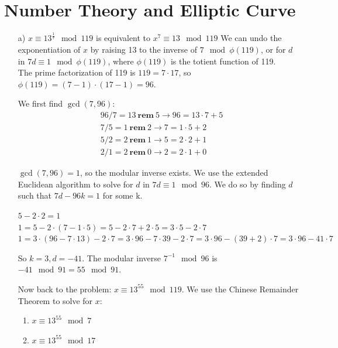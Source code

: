 \documentclass[10pt, oneside]{article}
\begin{document}
\section{Number Theory and Elliptic Curve}
\begin{itemize}
    \item[a)] $x \equiv 13^{\frac{1}{7}} \mod 119$ is equivalent to $x^7 \equiv 13 \mod 119$ 
            We can undo the exponentiation of $x$ by raising 13 to the inverse of $7 \mod \phi(119)$, or for $d$ in $7d \equiv 1 \mod \phi(119)$, where $\phi(119)$ is the totient function of 119. \\

            The prime factorization of 119 is $119 = 7 \cdot 17$, so $\phi(119) = (7-1)\cdot(17-1) = 96$.

            We first find $\gcd(7,96)$:
            \[
            \begin{aligned}
            &96/7 = 13 \ \mathbf{rem} \ 5 \rightarrow 96 = 13 \cdot 7 + 5 \\
            &7/5 = 1 \ \mathbf{rem} \ 2 \rightarrow 7 = 1 \cdot 5 + 2 \\
            &5/2 = 2 \ \mathbf{rem} \ 1 \rightarrow 5 = 2 \cdot 2 + 1 \\
            &2/1 = 2 \ \mathbf{rem} \ 0 \rightarrow 2 = 2 \cdot 1 + 0
            \end{aligned}
            \]

            $\gcd(7, 96) = 1$, so the modular inverse exists. We use the extended Euclidean algorithm to solve for $d$ in $7d \equiv 1 \mod 96$. We do so by finding $d$ such that $7d - 96k =1$ for some k.

            $5 - 2\cdot2 = 1$ \\
            $1 = 5 - 2\cdot(7 - 1\cdot 5) = 5 - 2\cdot 7 + 2\cdot 5 = 3\cdot5 - 2\cdot 7$ \\
            $1 = 3\cdot(96 - 7\cdot 13) - 2\cdot7 = 3\cdot96 - 7\cdot39 - 2\cdot7 = 3\cdot96 - (39+2)\cdot 7 = 3\cdot96 - 41 \cdot 7$

            So $k=3, d = -41$. The modular inverse $7^{-1} \mod 96$ is $-41 \mod 91 = 55 \mod 91$. 
            
            Now back to the problem: $x \equiv 13^{55} \mod 119$. We use the Chinese Remainder Theorem to solve for $x$: 
            \begin{enumerate}
                \item $x \equiv 13^{55} \mod 7$
                \item $x \equiv 13^{55} \mod 17$
            \end{enumerate}


\end{itemize}
\end{document}
